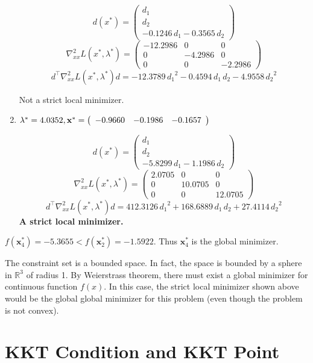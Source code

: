 \begin{enumerate}
\[
d(x^*) = \left(\begin{array}{c}
d_1 \\
d_2 \\
-0.1246\,d_1 -0.3565\,d_2 
\end{array}\right)
\]
\[
\nabla^2_{xx}L(x^*, \lambda^*) = \left(\begin{array}{ccc}
-12.2986 & 0 & 0\\
0 & -4.2986 & 0\\
0 & 0 & -2.2986
\end{array}\right)
\]
\[
d^\intercal \nabla^2_{xx}L(x^*, \lambda^*) d = -12.3789\,{d_1 }^2 -0.4594\,d_1 \,d_2 -4.9558\,{d_2 }^2
\]

Not a strict local minimizer.


\item $\lambda^* = 4.0352 , \mathbf{x^*} =\left(\begin{array}{ccc}
-0.9660 & -0.1986 & -0.1657
\end{array}\right)$

\[
d(x^*) = \left(\begin{array}{c}
d_1 \\
d_2 \\
-5.8299\,d_1 -1.1986\,d_2 
\end{array}\right)
\]
\[
\nabla^2_{xx}L(x^*, \lambda^*) = \left(\begin{array}{ccc}
2.0705 & 0 & 0\\
0 & 10.0705 & 0\\
0 & 0 & 12.0705
\end{array}\right)
\]
\[
d^\intercal \nabla^2_{xx}L(x^*, \lambda^*) d = 412.3126\,{d_1 }^2 +168.6889\,d_1 \,d_2 +27.4114\,{d_2 }^2
\]
\textbf{A strict local minimizer.}

\end{enumerate}

$f(\bm x_4^*) = -5.3655 < f(\bm x_2^*) = -1.5922$. Thus $\bm x_4^*$ is the global minimizer. 

The constraint set is a bounded space. In fact, the space is bounded by a sphere in $\mathbb{R}^3$ of radius 1. By Weierstrass theorem, there must exist a global minimizer for continuous function $f(x)$. In this case, the strict local minimizer shown above would be the global global minimizer for this problem (even though the problem is not convex).

\section{KKT Condition and KKT Point}

